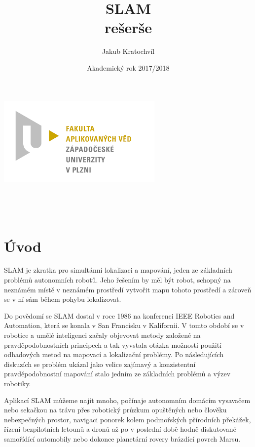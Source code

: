 \documentclass[12pt,a4paper]{article}
\begin{document}
\title{SLAM\\rešerše}
\author{Jakub Kratochvíl}
\date{Akademický rok 2017/2018}
\begin{titlepage}
\begin{center}
\includegraphics[scale=0.5]{logo_zcu}\\
\vspace{5cm}
\begin{Large}
\textbf{\thetitle}\\
\end{Large}
\vspace{3cm}
\theauthor\\
\vspace{5cm}
\thedate
\end{center}
\end{titlepage}
\newpage
		
		
\tableofcontents
\newpage
\fontsize{12pt}{18pt}\selectfont


\section{Úvod}
SLAM je zkratka pro simultánní lokalizaci a mapování, jeden ze základních problémů autonomních robotů. Jeho řešením by měl být robot, schopný na neznámém místě v neznámém prostředí vytvořit mapu tohoto prostředí a zároveň se v ní sám během pohybu lokalizovat.

Do povědomí se SLAM dostal v roce 1986 na konferenci IEEE Robotics and Automation, která se konala v San Francisku v Kalifornii. V tomto období se v robotice a umělé inteligenci začaly objevovat metody založené na pravděpodobnostních principech a tak vyvstala otázka možnosti použití odhadových metod na mapovací a lokalizační problémy. Po následujících diskuzích se problém ukázal jako velice zajímavý a konzistentní pravděpodobnostní mapování stalo jedním ze základních problémů a výzev robotiky.

Aplikací SLAM můžeme najít mnoho, počínaje autonomním domácím vysavačem nebo sekačkou na trávu přes robotický průzkum opuštěných nebo člověku nebezpečných prostor, navigaci ponorek kolem podmořských přírodních překážek, řízení bezpilotních letounů a dronů až po v poslední době hodně diskutované samořídící automobily nebo dokonce planetární rovery brázdící povrch Marsu.
\end{document}
